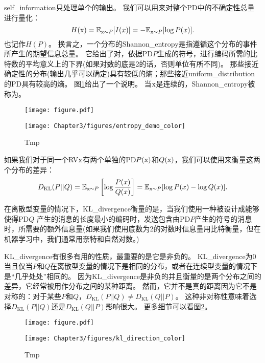 \gls{self_information}只处理单个的输出。
我们可以用来对整个\gls{PD}中的不确定性总量进行量化：
\begin{equation}
H(\mathrm{x}) = \mathbb{E}_{\mathrm{x} \sim P}[I(x)] = -\mathbb{E}_{\mathrm{x} \sim P}[\log P(x)].
\end{equation}
也记作$H(P)$。
换言之，一个分布的\gls{Shannon_entropy}是指遵循这个分布的事件所产生的期望信息总量。
它给出了对，依据\gls{PD}$P$生成的符号，进行编码所需的比特数的平均意义上的下界(如果对数的底是2的话，否则单位有所不同)。
那些接近确定性的分布(输出几乎可以确定)具有较低的熵；那些接近\gls{uniform_distribution}的\gls{PD}具有较高的熵。
图\ref{fig:chap3_entropy_demo_color}给出了一个说明。
当$\mathrm{x}$是连续的，\gls{Shannon_entropy}被称为。
\begin{figure}[!htb]
\ifOpenSource
\centerline{\texttt{[image: figure.pdf]}}
\else
\centerline{\texttt{[image: Chapter3/figures/entropy\_demo\_color]}}
\fi
\caption{Tmp}
\label{fig:chap3_entropy_demo_color}
\end{figure}



如果我们对于同一个\gls{RV}$\mathrm{x}$有两个单独的\gls{PD}$P(\mathrm{x})$和$Q(\mathrm{x})$，我们可以使用来衡量这两个分布的差异：
\begin{equation}
D_{\text{KL}}(P||Q) = \mathbb{E}_{\mathrm{x} \sim P} \left [  \log \frac{P(x)}{Q(x)} \right ] = \mathbb{E}_{\mathrm{x} \sim P} [\log P(x) - \log Q(x)].
\end{equation}

在离散型变量的情况下，\gls{KL_divergence}衡量的是，当我们使用一种被设计成能够使得\gls{PD}$Q$ 产生的消息的长度最小的编码时，发送包含由\gls{PD}$P$产生的符号的消息时，所需要的额外信息量(如果我们使用底数为2的对数时信息量用比特衡量，但在机器学习中，我们通常用奈特和自然对数。)

\gls{KL_divergence}有很多有用的性质，最重要的是它是非负的。
\gls{KL_divergence}为0当且仅当$P$和$Q$在离散型变量的情况下是相同的分布，或者在连续型变量的情况下是``几乎处处''相同的。
因为\gls{KL_divergence}是非负的并且衡量的是两个分布之间的差异，它经常被用作分布之间的某种距离。
然而，它并不是真的距离因为它不是对称的：对于某些$P$和$Q$，$D_\text{KL}(P||Q) \ne D_\text{KL}(Q||P)$。
这种非对称性意味着选择$D_\text{KL}(P||Q)$还是$D_\text{KL}(Q||P)$影响很大。
更多细节可以看图\ref{fig:chap3_kl_direction_color}。
\begin{figure}[!htb]
\ifOpenSource
\centerline{\texttt{[image: figure.pdf]}}
\else
\centerline{\texttt{[image: Chapter3/figures/kl\_direction\_color]}}
\fi
\caption{Tmp}
\label{fig:chap3_kl_direction_color}
\end{figure}


